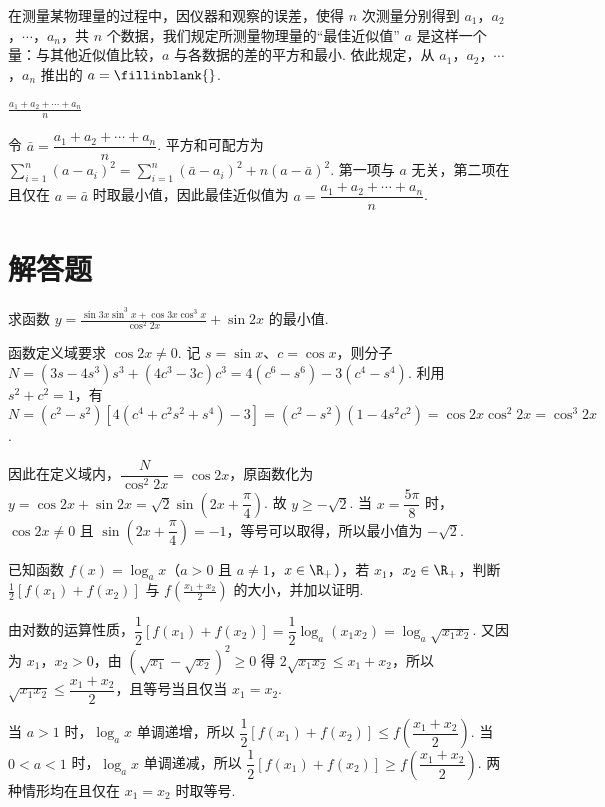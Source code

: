 \begin{problem}
在测量某物理量的过程中，因仪器和观察的误差，使得 \(n\) 次测量分别得到 \(a_{1}\)，\(a_{2}\)，\(\cdots\)，\(a_{n}\)，共 \(n\) 个数据，我们规定所测量物理量的“最佳近似值” \(a\) 是这样一个量：与其他近似值比较，\(a\) 与各数据的差的平方和最小. 依此规定，从 \(a_{1}\)，\(a_{2}\)，\(\cdots\)，\(a_{n}\) 推出的 \(a =\fillinblank{}\).
\end{problem}

\begin{answer}
\(\frac{a_1+a_2+\cdots+a_n}{n}\)
\end{answer}

\begin{solution}
令 \(\bar a=\dfrac{a_1+a_2+\cdots+a_n}{n}\). 平方和可配方为
\(\sum_{i=1}^{n}(a-a_i)^2=\sum_{i=1}^{n}(\bar a-a_i)^2+n(a-\bar a)^2\). 第一项与 \(a\) 无关，第二项在且仅在 \(a=\bar a\) 时取最小值，因此最佳近似值为 \(a=\dfrac{a_1+a_2+\cdots+a_n}{n}\).
\end{solution}

\section{解答题}

\begin{problem}
求函数 \(y = \frac{\sin 3x\sin^3 x + \cos 3x\cos^3 x}{\cos^2 2x} + \sin 2x \) 的最小值.
\end{problem}

\begin{solution}
函数定义域要求 \(\cos2x\neq0\). 记 \(s=\sin x\)、\(c=\cos x\)，则分子
\(N=(3s-4s^3)s^3+(4c^3-3c)c^3=4(c^6-s^6)-3(c^4-s^4)\). 利用 \(s^2+c^2=1\)，有
\(N=(c^2-s^2)\left[4(c^4+c^2s^2+s^4)-3\right]=(c^2-s^2)(1-4s^2c^2)=\cos2x\cos^2 2x=\cos^3 2x\).

因此在定义域内，\(\dfrac{N}{\cos^2 2x}=\cos2x\)，原函数化为 \(y=\cos2x+\sin2x=\sqrt2\sin\left(2x+\dfrac\pi4\right)\). 故 \(y\geqslant-\sqrt2\). 当 \(x=\dfrac{5\pi}{8}\) 时，\(\cos2x\neq0\) 且 \(\sin\left(2x+\dfrac\pi4\right)=-1\)，等号可以取得，所以最小值为 \(-\sqrt2\).
\end{solution}

\begin{problem}
已知函数 \(f(x) = \log_a x\)（\(a > 0\) 且 \(a \neq 1\)，\(x \in \R_+\)），若 \(x_1\)，\(x_2 \in \R_+\)，判断 \(\frac{1}{2} [f(x_1) + f(x_2)] \) 与 \(f\left(\frac{x_1 + x_2}{2}\right) \) 的大小，并加以证明.
\end{problem}

\begin{solution}
由对数的运算性质，\(\dfrac12[f(x_1)+f(x_2)]=\dfrac12\log_a(x_1x_2)=\log_a\sqrt{x_1x_2}\). 又因为 \(x_1\)，\(x_2>0\)，由 \(\left(\sqrt{x_1}-\sqrt{x_2}\right)^2\geqslant0\) 得 \(2\sqrt{x_1x_2}\leqslant x_1+x_2\)，所以 \(\sqrt{x_1x_2}\leqslant\dfrac{x_1+x_2}{2}\)，且等号当且仅当 \(x_1=x_2\).

当 \(a>1\) 时，\(\log_a x\) 单调递增，所以 \(\dfrac12[f(x_1)+f(x_2)]\leqslant f\left(\dfrac{x_1+x_2}{2}\right)\). 当 \(0<a<1\) 时，\(\log_a x\) 单调递减，所以 \(\dfrac12[f(x_1)+f(x_2)]\geqslant f\left(\dfrac{x_1+x_2}{2}\right)\). 两种情形均在且仅在 \(x_1=x_2\) 时取等号.
\end{solution}


